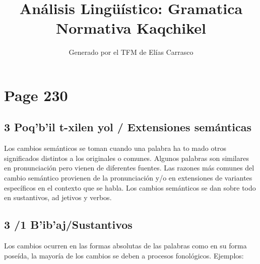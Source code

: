 \documentclass{article}%
\title{Análisis Lingüístico: Gramatica Normativa Kaqchikel}%
\author{Generado por el TFM de Elías Carrasco}%
\begin{document}
%
\normalsize%
\maketitle%
\section{Page 230}%
\label{sec:Page230}%
\subsection{3 Poq’b’il t{-}xilen yol / Extensiones semánticas}%
\label{subsec:3Poqbilt{-}xilenyol/Extensionessemnticas}%

%
Los cambios semánticos se toman cuando una palabra ha to mado otros significados distintos a los originales o comunes. Algunos palabras son similares en pronunciación pero vienen de diferentes fuentes. %
Las razones más comunes del cambio semántico provienen de la pronunciación y/o en extensiones de variantes específicos en el contexto que se habla. %
Los cambios semánticos se dan sobre todo en sustantivos, ad jetivos y verbos. %
\subsection{3 /1 B’ib’aj/Sustantivos}%
\label{subsec:3/1Bibaj/Sustantivos}%

%
Los cambios ocurren en las formas absolutas de las palabras como en su forma poseída, la mayoría de los cambios se deben a procesos fonológicos. %
Ejemplos: 

%
\end{document}
